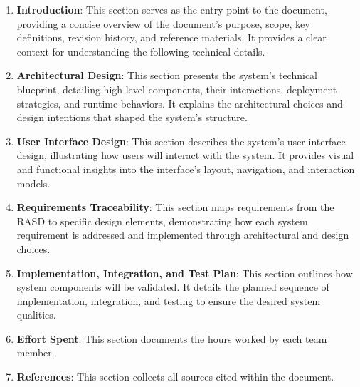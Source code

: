 \begin{enumerate}
      \item \textbf{Introduction}: This section serves as the entry point to the document, providing a concise overview
            of the document's purpose, scope, key definitions, revision history, and reference materials. It provides a
            clear context for understanding the following technical details.
      \item \textbf{Architectural Design}: This section presents the system's technical blueprint, detailing high-level
            components, their interactions, deployment strategies, and runtime behaviors. It explains the architectural
            choices and design intentions that shaped the system's structure.
      \item \textbf{User Interface Design}: This section describes the system's user interface design, illustrating how
            users will interact with the system. It provides visual and functional insights into the interface's layout,
            navigation, and interaction models.
      \item \textbf{Requirements Traceability}: This section maps requirements from the RASD to specific design elements,
            demonstrating how each system requirement is addressed and implemented through architectural and design
            choices.
            \pagebreak
      \item \textbf{Implementation, Integration, and Test Plan}: This section outlines how system components will be
            validated. It details the planned sequence of implementation, integration, and testing to ensure the desired
            system qualities.
      \item \textbf{Effort Spent}: This section documents the hours worked by each team member.
      \item \textbf{References}: This section collects all sources cited within the document.
\end{enumerate}
